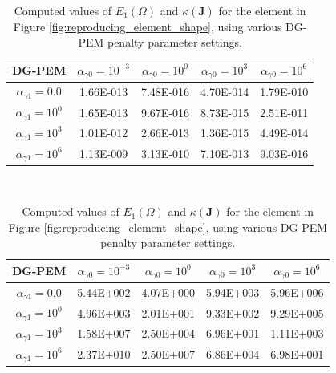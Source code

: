 \begin{table}
\centering
\begin{subtable}{1.0\textwidth}
\centering
\begin{tabular}{| c || c | c | c | c |}
    \hline
DG-PEM & $\alpha_{\gamma0} = 10^{-3}$ & $\alpha_{\gamma0} = 10^{0}$ & $\alpha_{\gamma0} = 10^{3}$ & $\alpha_{\gamma0} = 10^{6}$ \\ \hline \hline
$\alpha_{\gamma1} = 0.0$	& 1.66E-013 & 7.48E-016 & 4.70E-014 & 1.79E-010 \\ \hline
$\alpha_{\gamma1} = 10^{0}$ & 1.65E-013 & 9.67E-016 & 8.73E-015 & 2.51E-011 \\ \hline
$\alpha_{\gamma1} = 10^{3}$ & 1.01E-012 & 2.66E-013 & 1.36E-015 & 4.49E-014 \\ \hline
$\alpha_{\gamma1} = 10^{6}$ & 1.13E-009 & 3.13E-010 & 7.10E-013 & 9.03E-016 \\
    \hline
    \end{tabular}
    \caption{Interpolation error: $E_1 (\Omega)$}
    \label{tab:interpolation_error_k1}
\end{subtable}%
\\
\begin{subtable}{1.0\textwidth}
\centering
\begin{tabular}{| c || c | c | c | c |}
    \hline
DG-PEM & $\alpha_{\gamma0} = 10^{-3}$	&	$\alpha_{\gamma0} = 10^{0}$	&	$\alpha_{\gamma0} = 10^{3}$	&	$\alpha_{\gamma0} = 10^{6}$ \\ \hline \hline
$\alpha_{\gamma1} = 0.0$	&	5.44E+002 & 4.07E+000 & 5.94E+003 & 5.96E+006 \\ \hline
$\alpha_{\gamma1} = 10^{0}$	&	4.96E+003 & 2.01E+001 & 9.33E+002 & 9.29E+005 \\ \hline
$\alpha_{\gamma1} = 10^{3}$	&	1.58E+007 & 2.50E+004 & 6.96E+001 & 1.11E+003 \\ \hline
$\alpha_{\gamma1} = 10^{6}$	&	2.37E+010 & 2.50E+007 & 6.86E+004 & 6.98E+001 \\
    \hline
    \end{tabular}
    \caption{DG-PEM linear system conditioning: $\kappa(\mathbf{J})$}
    \label{tab:condJ_k1}
\end{subtable}

\caption{Computed values of $E_1 (\Omega)$ and $\kappa(\mathbf{J})$ for the element in Figure \ref{fig:reproducing_element_shape}, using various DG-PEM penalty parameter settings.}
\label{tab:interpolation_error_and_condJ_k1}
\end{table}

